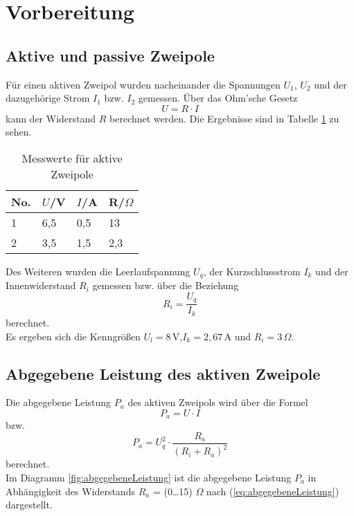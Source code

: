 \section{Vorbereitung}

\subsection{Aktive und passive Zweipole}

Für einen aktiven Zweipol wurden nacheinander die Spannungen $U_1$, $U_2$ und der dazugehörige Strom $I_1$ bzw. $I_2$ gemessen.
Über das Ohm'sche Gesetz
\begin{equation*}
    \label{eq:ohmschesGesetz}
    U=R\cdot I
\end{equation*} kann der Widerstand $R$ berechnet werden. Die Ergebnisse sind in Tabelle \ref{tab:aktiveZweipole} zu sehen.
\begin{center}
    \begin{table}[ht]
        \begin{tabularx}{\linewidth}{|*{4}{X|}}
            \hline
            No. & $U$/V & $I$/A & R/${\Omega}$ \\
            \hline
            1   & 6,5   & 0,5   & 13           \\
            \hline
            2   & 3,5   & 1,5   & 2,3          \\
            \hline
        \end{tabularx}
        \caption{Messwerte für aktive Zweipole}
        \label{tab:aktiveZweipole}
    \end{table}
\end{center}
Des Weiteren wurden die Leerlaufspannung $U_q$, der Kurzschlussstrom $I_k$ und der Innenwiderstand $R_i$ gemessen bzw. über die Beziehung
\begin{equation*}
    \label{eq:innenwiderstand}
    R_i=\frac{U_q}{I_k}
\end{equation*} berechnet.\\
Es ergeben sich die Kenngrößen $U_l=8\,$V,$I_k=2,67\,$A und $R_i=3\,\Omega$.

\subsection{Abgegebene Leistung des aktiven Zweipole}
Die abgegebene Leistung $P_a$ des aktiven Zweipols wird über die Formel
\begin{equation*}
    P_a=U\cdot I
\end{equation*}
bzw.
\begin{equation}
    \label{eq:abgegebeneLeistung}
    P_a=U_q^{2}\cdot{\frac{R_a}{(R_i+R_a)^2}}
\end{equation}
berechnet.\\
Im Diagramm \ref{fig:abgegebeneLeistung} ist die abgegebene Leistung $P_a$ in Abhängigkeit des Widerstands $R_a$ = (0\dots15) $\Omega$ nach (\ref{eq:abgegebeneLeistung}) dargestellt.

